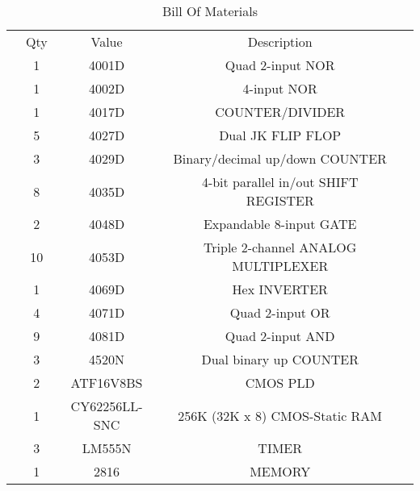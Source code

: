 \documentclass[letterpaper,titlepage,oneside]{article}
\begin{document}
\begin{table}[h!]
\begin{center}
\begin{tabular}{c|c|c|c|c}
\cline{2-4}
&	Qty	&	Value	&	Description	&	\\
\cline{2-4}
& 1 & 4001D & Quad 2-input NOR  & \\
& 1 & 4002D & 4-input NOR & \\
& 1 & 4017D & COUNTER/DIVIDER & \\
& 5 & 4027D & Dual JK FLIP FLOP & \\
& 3 & 4029D & Binary/decimal up/down COUNTER  & \\
& 8 & 4035D & 4-bit parallel in/out SHIFT REGISTER  & \\
& 2 & 4048D & Expandable 8-input GATE & \\
& 10  & 4053D & Triple 2-channel ANALOG MULTIPLEXER & \\
& 1 & 4069D & Hex INVERTER  & \\
& 4 & 4071D & Quad 2-input OR & \\
& 9 & 4081D & Quad 2-input AND  & \\
& 3 & 4520N & Dual binary up COUNTER  & \\
& 2 & ATF16V8BS & CMOS PLD  & \\
& 1 & CY62256LL-SNC & 256K (32K x 8) CMOS-Static RAM  & \\
& 3 & LM555N  & TIMER & \\
& 1 & 2816  & MEMORY  & \\
\cline{2-4}

\end{tabular}
\end{center}
\caption{Bill Of Materials}\label{BOM}
\end{table}
\end{document}
